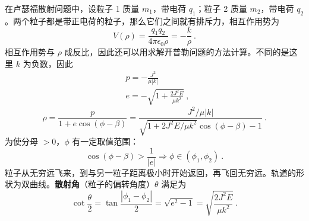 在卢瑟福散射问题中，设粒子 1 质量 $m_1$，带电荷 $q_1$；粒子 2 质量 $m_2$，带电荷 $q_2$。两个粒子都是带正电荷的粒子，那么它们之间就有排斥力，相互作用势为
\begin{equation}
V(\rho)=\frac{q_1q_2}{4\pi\epsilon_0\rho}=-\frac{k}{\rho}~.
\end{equation}
相互作用势与 $\rho$ 成反比，因此还可以用求解开普勒问题的方法计算。不同的是这里 $k$ 为负数，因此
\begin{equation}
\begin{aligned}
&p=-\frac{J^2}{\mu |k|}\\
&e=-\sqrt{1+\frac{2J^2E}{\mu k^2}}~,
\end{aligned}
\end{equation}
\begin{equation}
\rho=\frac{p}{1+e\cos(\phi-\beta)}=\frac{J^2/\mu |k|}{\sqrt{1+2J^2E/\mu k^2}\cos(\phi-\beta)-1}~.
\end{equation}
为使分母 $>0$，$\phi$ 有一定取值范围：
\begin{equation}
\cos(\phi-\beta)>\frac{1}{|e|}
\Rightarrow \phi \in (\phi_1,\phi_2)~.
\end{equation}
粒子从无穷远飞来，到与另一粒子距离极小时开始返回，再飞回无穷远。轨道的形状为双曲线。\textbf{散射角}（粒子的偏转角度）$\theta$ 满足为
\begin{equation}
\cot\frac{\theta}{2}=\tan\frac{|\phi_1-\phi_2|}{2} =\sqrt{e^2-1}=\sqrt{\frac{2J^2E}{\mu k^2}}~.
\end{equation}

